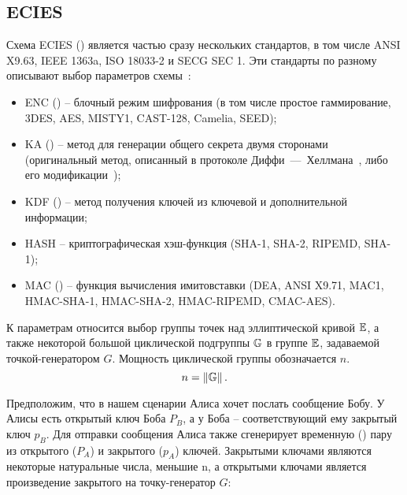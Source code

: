 \subsection{ECIES}

Схема ECIES () является частью сразу нескольких стандартов, в том числе ANSI X9.63, IEEE 1363a, ISO 18033-2 и SECG SEC 1. Эти стандарты по разному описывают выбор параметров схемы~\cite{Martinez:Encinas:Avila:2010}:

\begin{itemize}
	\item ENC () -- блочный режим шифрования (в том числе простое гаммирование, 3DES, AES, MISTY1, CAST-128, Camelia, SEED);
	\item KA () -- метод для генерации общего секрета двумя сторонами (оригинальный метод, описанный в протоколе Диффи~---~Хеллмана~\cite{Diffie:Hellman:1976}, либо его модификации~\cite{Miller:1986});
	\item KDF () -- метод получения ключей из ключевой и дополнительной информации;
	\item HASH -- криптографическая хэш-функция (SHA-1, SHA-2, RIPEMD, SHA-1);
	\item MAC () -- функция вычисления имитовставки (DEA, ANSI X9.71, MAC1, HMAC-SHA-1, HMAC-SHA-2, HMAC-RIPEMD, CMAC-AES).
\end{itemize}

К параметрам относится выбор группы точек над эллиптической кривой $\mathbb{E}$, а также некоторой большой циклической подгруппы $\mathbb{G}$ в группе $\mathbb{E}$, задаваемой точкой-генератором $G$. Мощность циклической группы обозначается $n$.
\[n = \left\| \mathbb{G} \right\|.\]

Предположим, что в нашем сценарии Алиса хочет послать сообщение Бобу. У Алисы есть открытый ключ Боба $P_B$, а у Боба -- соответствующий ему закрытый ключ $p_B$. Для отправки сообщения Алиса также сгенерирует временную () пару из открытого ($P_A$) и закрытого ($p_A$) ключей. Закрытыми ключами являются некоторые натуральные числа, меньшие n, а открытыми ключами является произведение закрытого на точку-генератор $G$:

